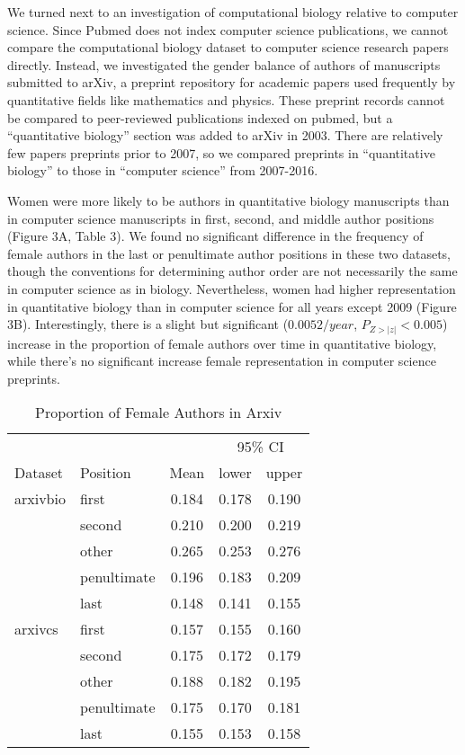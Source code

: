 \documentclass[10pt,letterpaper]{article}
\begin{document}
\begin{flushleft}
We turned next to an investigation of computational biology relative to computer science. Since Pubmed does not index computer science publications, we cannot compare the computational biology dataset to computer science research papers directly. Instead, we investigated the gender balance of authors of manuscripts submitted to arXiv, a preprint repository for academic papers used frequently by quantitative fields like mathematics and physics. These preprint records cannot be compared to peer-reviewed publications indexed on pubmed, but a “quantitative biology” section was added to arXiv in 2003. There are relatively few papers preprints prior to 2007, so we compared preprints in “quantitative biology” to those in “computer science” from 2007-2016.

Women were more likely to be authors in quantitative biology manuscripts than in computer science manuscripts in first, second, and middle author positions (Figure 3A, Table 3). We found no significant difference in the frequency of female authors in the last or penultimate author positions in these two datasets, though the conventions for determining author order are not necessarily the same in computer science as in biology. Nevertheless, women had higher representation in quantitative biology than in computer science for all years except 2009 (Figure 3B). Interestingly, there is a slight but significant ($0.0052 / year$, $P_{Z > |z|} < 0.005$) increase in the proportion of female authors over time in quantitative biology, while there’s no significant increase female representation in computer science preprints.

\begin{table}[]
\centering
\caption{Proportion of Female Authors in Arxiv}
\label{Table 3}
\begin{tabular}{llccc}
\toprule
        &                  &       & \multicolumn{2}{c}{95\% CI} \\
\cmidrule(r){4-5}
Dataset      & Position    & Mean  & lower        & upper        \\
\midrule
arxivbio     & first       & 0.184 & 0.178        & 0.190        \\
             & second      & 0.210 & 0.200        & 0.219        \\
             & other       & 0.265 & 0.253        & 0.276        \\
             & penultimate & 0.196 & 0.183        & 0.209        \\
             & last        & 0.148 & 0.141        & 0.155        \\
arxivcs      & first       & 0.157 & 0.155        & 0.160        \\
             & second      & 0.175 & 0.172        & 0.179        \\
             & other       & 0.188 & 0.182        & 0.195        \\
             & penultimate & 0.175 & 0.170        & 0.181        \\
             & last        & 0.155 & 0.153        & 0.158        \\
\bottomrule
\end{tabular}
\end{table}


\end{flushleft}
\end{document}
